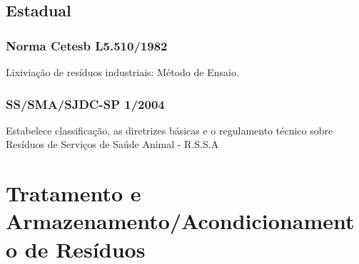 \begin{subapend}
	\subsection{Estadual}
	\begin{subsubapend}
		\subsubsection{Norma Cetesb L5.510/1982}
		Lixiviação de resíduos industriais: Método de Ensaio.
		\subsubsection{SS/SMA/SJDC-SP 1/2004}
		Estabelece classificação, as diretrizes básicas e o regulamento técnico sobre Resíduos de Serviços de Saúde Animal - R.S.S.A
	\end{subsubapend}
\end{subapend}

\section{Tratamento e Armazenamento/Acondicionamento de Resíduos}

